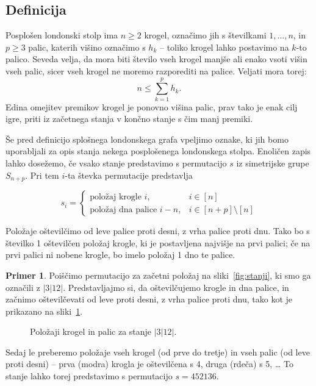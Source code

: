 \documentclass[12pt,a4paper]{amsart}
\theoremstyle{definition} %
\newtheorem{primer}[definicija]{Primer}
\theoremstyle{plain} %
\begin{document}
\subsection{Definicija}

Posplošen londonski stolp ima $n \geq 2$ krogel, označimo jih s številkami $1,\ldots,n$, in $p \geq 3$ palic, katerih višino označimo s $h_k$ -- toliko krogel lahko postavimo na $k$-to palico. Seveda velja, da mora biti število vseh krogel manjše ali enako vsoti višin vseh palic, sicer vseh krogel ne moremo razporediti na palice. Veljati mora torej:
\[ n \leq \sum_{k=1}^{p} h_k.\]
Edina omejitev premikov krogel je ponovno višina palic, prav tako je enak cilj igre, priti iz začetnega stanja v končno stanje s čim manj premiki.

Še pred definicijo splošnega londonskega grafa vpeljimo oznake, ki jih bomo uporabljali za opis stanja nekega posplošenega londonskega stolpa. Enoličen zapis lahko dosežemo, če vsako stanje predstavimo s permutacijo $s$ iz simetrijske grupe $S_{n+p}$. Pri tem $i$-ta števka permutacije predstavlja

\[ s_i =
\begin{cases}
    \text{položaj krogle } i, & i \in [n] \\
    \text{položaj dna palice } i-n, & i \in [n+p] \setminus [n]
\end{cases}
\]

Položaje oštevilčimo od leve palice proti desni, z vrha palice proti dnu. Tako bo s številko 1 oštevilčen položaj krogle, ki je postavljena najvišje na prvi palici; če na prvi palici ni nobene krogle, bo imelo položaj 1 dno te palice.

\begin{primer}
    Poiščimo permutacijo za začetni položaj na sliki~\ref{fig:stanji}, ki smo ga označili z $|3|12|$. 
    Predstavljajmo si, da oštevilčujemo krogle in dna palice, in začnimo oštevilčevati od leve proti desni, z vrha palice proti dnu, tako kot je prikazano na sliki~\ref{fig:ostev-stanji}.
    
    \begin{figure}[h]
        \caption{Položaji krogel in palic za stanje $|3|12|$.}
        \label{fig:ostev-stanji}
    \end{figure}
    
    Sedaj le preberemo položaje vseh krogel (od prve do tretje) in vseh palic (od leve proti desni) -- prva (modra) krogla je oštevilčena s 4, druga (rdeča) s 5, \ldots
    To stanje lahko torej predstavimo s permutacijo $s=452136$.
\end{primer}
\end{document}
